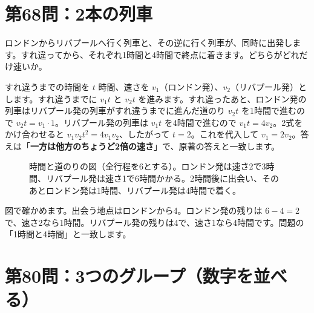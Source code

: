\documentclass[a4paper,11pt,openany]{ltjsbook}
\begin{document}
\section{第68問：2本の列車}

ロンドンからリバプールへ行く列車と、その逆に行く列車が、同時に出発します。すれ違ってから、それぞれ1時間と4時間で終点に着きます。どちらがどれだけ速いか。

すれ違うまでの時間を $t$ 時間、速さを $v_1$（ロンドン発）、$v_2$（リバプール発）とします。すれ違うまでに $v_1t$ と $v_2t$ を進みます。すれ違ったあと、ロンドン発の列車はリバプール発の列車がすれ違うまでに進んだ道のり $v_2t$ を1時間で進むので $v_2t=v_1\cdot1$。リバプール発の列車は $v_1t$ を4時間で進むので $v_1t=4v_2$。2式をかけ合わせると $v_1v_2t^2=4v_1v_2$、したがって $t=2$。これを代入して $v_1=2v_2$。答えは「\textbf{一方は他方のちょうど2倍の速さ}」で、原著の答えと一致します。

\begin{figure}[htbp]
\centering
{}
\caption{時間と道のりの図（全行程を6とする）。ロンドン発は速さ2で3時間、リバプール発は速さ1で6時間かかる。2時間後に出会い、そのあとロンドン発は1時間、リバプール発は4時間で着く。}
\end{figure}

\noindent 図で確かめます。出会う地点はロンドンから4。ロンドン発の残りは $6-4=2$ で、速さ2なら1時間。リバプール発の残りは4で、速さ1なら4時間です。問題の「1時間と4時間」と一致します。

\section{第80問：3つのグループ（数字を並べる）}
\end{document}
